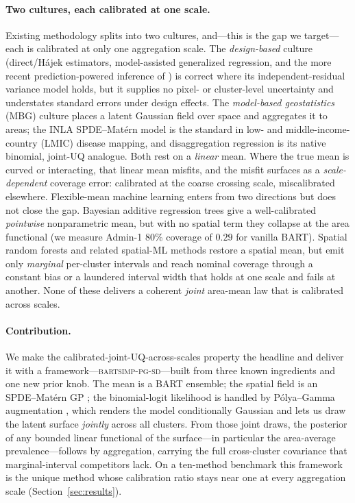\documentclass[11pt]{article}
\theoremstyle{remark}
\newcommand{\bartsimpsd}{\textsc{bartsimp-pg-sd}}
\begin{document}
\paragraph{Two cultures, each calibrated at one scale.}
Existing methodology splits into two cultures, and---this is the gap we
target---each is calibrated at only one aggregation scale. The
\emph{design-based} culture (direct/H\'ajek estimators, model-assisted
generalized regression, and the more recent prediction-powered inference of
\citealp{angelopoulos2023ppi}) is correct where its independent-residual variance
model holds, but it supplies no pixel- or cluster-level uncertainty and
understates standard errors under design effects. The \emph{model-based
geostatistics} (MBG) culture \citep{diggle1998mbg,rue2009inla,lindgren2011spde}
places a latent Gaussian field over space and aggregates it to areas; the INLA
SPDE--Mat\'ern model is the standard in low- and middle-income-country (LMIC)
disease mapping, and disaggregation regression \citep{nandi2023disaggregation}
is its native binomial, joint-UQ analogue. Both rest on a \emph{linear} mean.
Where the true mean is curved or interacting, that linear mean misfits, and the
misfit surfaces as a \emph{scale-dependent} coverage error: calibrated at the
coarse crossing scale, miscalibrated elsewhere. Flexible-mean machine learning
enters from two directions but does not close the gap. Bayesian additive
regression trees \citep[BART;][]{chipman2010bart} give a well-calibrated
\emph{pointwise} nonparametric mean, but with no spatial term they collapse at
the area functional (we measure Admin-1 80\% coverage of $0.29$ for vanilla
BART). Spatial random forests \citep[RF-GLS;][]{saha2023rfgls} and related
spatial-ML methods restore a spatial mean, but emit only \emph{marginal}
per-cluster intervals and reach nominal coverage through a constant bias or a
laundered interval width that holds at one scale and fails at another. None of
these delivers a coherent \emph{joint} area-mean law that is calibrated across
scales.

\paragraph{Contribution.}
We make the calibrated-joint-UQ-across-scales property the headline and deliver
it with a framework---\bartsimpsd---built from three known ingredients and one
new prior knob. The mean is a BART ensemble; the spatial field is an
SPDE--Mat\'ern GP \citep{lindgren2011spde}; the binomial-logit likelihood is
handled by P\'olya--Gamma augmentation \citep{polson2013polyagamma}, which renders
the model conditionally Gaussian and lets us draw the latent surface
\emph{jointly} across all clusters. From those joint draws, the posterior of any
bounded linear functional of the surface---in particular the area-average
prevalence---follows by aggregation, carrying the full cross-cluster covariance
that marginal-interval competitors lack. On a ten-method benchmark this framework
is the unique method whose calibration ratio stays near one at every aggregation
scale (Section~\ref{sec:results}).
\end{document}
